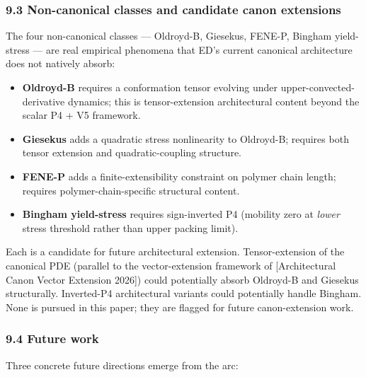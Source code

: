 \documentclass[
  11pt,a4paper]{article}
\providecommand{\tightlist}{%
  \setlength{\itemsep}{0pt}\setlength{\parskip}{0pt}}
\begin{document}
\subsubsection{9.3 Non-canonical classes and candidate canon
extensions}\label{non-canonical-classes-and-candidate-canon-extensions}

The four non-canonical classes --- Oldroyd-B, Giesekus, FENE-P, Bingham
yield-stress --- are real empirical phenomena that ED's current
canonical architecture does not natively absorb:

\begin{itemize}
\tightlist
\item
  \textbf{Oldroyd-B} requires a conformation tensor evolving under
  upper-convected-derivative dynamics; this is tensor-extension
  architectural content beyond the scalar P4 + V5 framework.
\item
  \textbf{Giesekus} adds a quadratic stress nonlinearity to Oldroyd-B;
  requires both tensor extension and quadratic-coupling structure.
\item
  \textbf{FENE-P} adds a finite-extensibility constraint on polymer
  chain length; requires polymer-chain-specific structural content.
\item
  \textbf{Bingham yield-stress} requires sign-inverted P4 (mobility zero
  at \emph{lower} stress threshold rather than upper packing limit).
\end{itemize}

Each is a candidate for future architectural extension. Tensor-extension
of the canonical PDE (parallel to the vector-extension framework of
{[}Architectural Canon Vector Extension 2026{]}) could potentially
absorb Oldroyd-B and Giesekus structurally. Inverted-P4 architectural
variants could potentially handle Bingham. None is pursued in this
paper; they are flagged for future canon-extension work.

\subsubsection{9.4 Future work}\label{future-work}

Three concrete future directions emerge from the arc:
\end{document}
